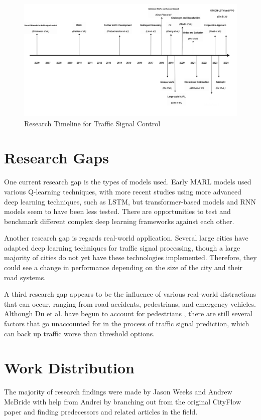 \documentclass[conference]{IEEEtran}
\begin{document}
\begin{figure}[H]
    \centering
    \includegraphics[width=0.9\linewidth]{Diagram Timeline.png}
    \caption{Research Timeline for Traffic Signal Control}
\end{figure}

\section{Research Gaps}
One current research gap is the types of models used. Early MARL models used various Q-learning techniques, with more recent studies using more advanced deep learning techniques, such as LSTM, but transformer-based models and RNN models seem to have been less tested. There are opportunities to test and benchmark different complex deep learning frameworks against each other. 

Another research gap is regards real-world application. Several large cities have adapted deep learning techniques for traffic signal processing, though a large majority of cities do not yet have these technologies implemented. Therefore, they could see a change in performance depending on the size of the city and their road systems. 

A third research gap appears to be the influence of various real-world distractions that can occur, ranging from road accidents, pedestrians, and emergency vehicles. Although Du et al. have begun to account for pedestrians \cite{13}, there are still several factors that go unaccounted for in the process of traffic signal prediction, which can back up traffic worse than threshold options.

\section*{Work Distribution}
The majority of research findings were made by Jason Weeks and Andrew McBride with help from Andrei by branching out from the original CityFlow paper \cite{7} and finding predecessors and related articles in the field. 
\end{document}

